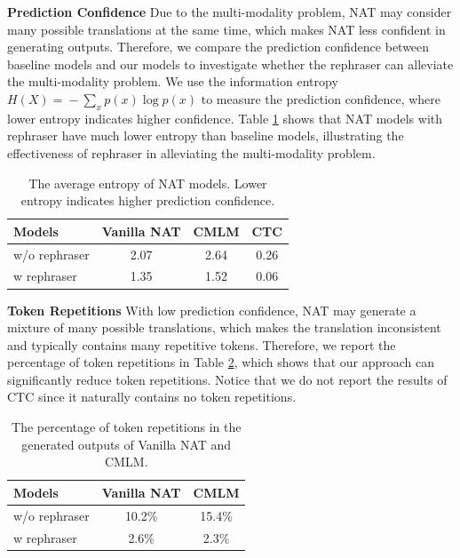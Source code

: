 \documentclass[letterpaper]{article} %
\begin{document}
\vspace{5pt}
\noindent{}\textbf{Prediction Confidence} Due to the multi-modality problem, NAT may consider many possible translations at the same time, which makes NAT less confident in generating outputs. Therefore, we compare the prediction confidence between baseline models and our models to investigate whether the rephraser can alleviate the multi-modality problem. We use the information entropy $H(X)\!=\!-\!\sum_{x}p(x)\log p(x)$ to measure the prediction confidence, where lower entropy indicates higher confidence. Table \ref{tab:entropy} shows that NAT models with rephraser have much lower entropy than baseline models, illustrating the effectiveness of rephraser in alleviating the multi-modality problem.
\begin{table}[t]
\small
\centering
\begin{tabular}{lccc}
\toprule
{\textbf{Models}} & {\textbf{Vanilla NAT}} & {\textbf{CMLM}} & {\textbf{CTC}}\\
\midrule
w/o rephraser&2.07&2.64&0.26\\
w rephraser&1.35&1.52&0.06\\
\bottomrule
\end{tabular}
\caption{The average entropy of NAT models. Lower entropy indicates higher prediction confidence.}
\label{tab:entropy}
\end{table}

\vspace{5pt}
\noindent{}\textbf{Token Repetitions} With low prediction confidence, NAT may generate a mixture of many possible translations, which makes the translation inconsistent and typically contains many repetitive tokens. Therefore, we report the percentage of token repetitions in Table \ref{tab:rep}, which shows that our approach can significantly reduce token repetitions. Notice that we do not report the results of CTC since it naturally contains no token repetitions.

\begin{table}[t]
\small
\centering
\begin{tabular}{lcc}
\toprule
{\textbf{Models}} & {\textbf{Vanilla NAT}} & {\textbf{CMLM}}\\
\midrule
w/o rephraser&10.2\%&15.4\%\\
w rephraser&2.6\%&2.3\%\\
\bottomrule
\end{tabular}
\caption{The percentage of token repetitions in the generated outputs of Vanilla NAT and CMLM.}
\label{tab:rep}
\end{table}
\end{document}
